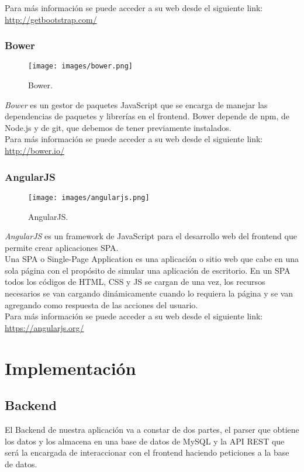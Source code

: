 Para más información se puede acceder a su web desde el siguiente link:\\ \url{http://getbootstrap.com/}

\subsubsection*{Bower}
\begin{figure}[H]
	\centering
	\texttt{[image: images/bower.png]}
	\caption{Bower.}
\end{figure}
\textit{Bower} es un gestor de paquetes JavaScript que se encarga de manejar las
dependencias de paquetes y librerías en el frontend. Bower depende de npm, de Node.js y de git, que debemos de tener previamente instalados.\\  

Para más información se puede acceder a su web desde el siguiente link:\\ \url{http://bower.io/}

\subsubsection*{AngularJS}
\begin{figure}[H]
	\centering
	\texttt{[image: images/angularjs.png]}
	\caption{AngularJS.}
\end{figure}
\textit{AngularJS} es un framework de JavaScript para el desarrollo web del frontend que permite crear aplicaciones SPA.\\

Una SPA o Single-Page Application es una aplicación o sitio web que cabe en una sola página con el propósito de simular una aplicación de escritorio. En un SPA todos los códigos de HTML, CSS y JS se cargan de una vez, los recursos necesarios se van cargando dinámicamente cuando lo requiera la página y se van agregando como respuesta de las acciones del usuario.\\  

Para más información se puede acceder a su web desde el siguiente link:\\ \url{https://angularjs.org/}

\section{Implementación}

\subsection{Backend}
El Backend de nuestra aplicación va a constar de dos partes, el parser que obtiene los datos y los almacena en una base de datos de MySQL y la API REST que será la encargada de interaccionar con el frontend haciendo peticiones a la base de datos.\\


